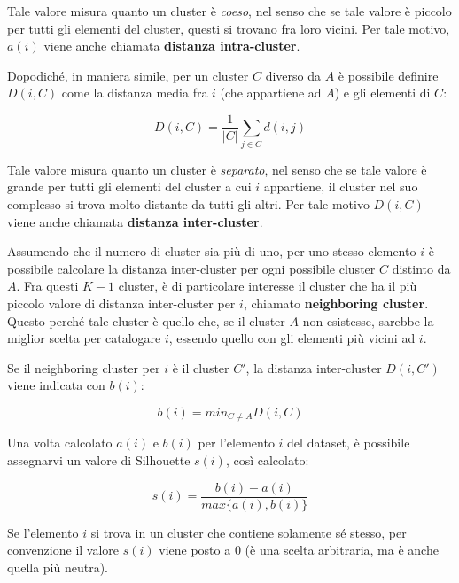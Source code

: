 \documentclass[a4paper, 12pt]{report}
\begin{document}
			Tale valore misura quanto un cluster è \textit{coeso}, nel senso
			che se tale valore è piccolo per tutti gli elementi del cluster,
			questi si trovano fra loro vicini. Per tale motivo, $a(i)$ viene
			anche chiamata \textbf{distanza intra-cluster}.

			Dopodiché, in maniera simile, per un cluster $C$ diverso da $A$
			è possibile definire $D(i, C)$ come la distanza media fra $i$
			(che appartiene ad $A$) e gli elementi di $C$:

			\begin{equation*}
				D(i, C) = \frac{1}{|C|} \sum_{j \in C} d(i, j)
			\end{equation*}

			Tale valore misura quanto un cluster è \textit{separato}, nel senso
			che se tale valore è grande per tutti gli elementi del cluster a cui
			$i$ appartiene, il cluster nel suo complesso si trova molto distante
			da tutti gli altri. Per tale motivo $D(i, C)$ viene anche chiamata
			\textbf{distanza inter-cluster}.

			Assumendo che il numero di cluster sia più di uno, per uno stesso elemento
			$i$ è possibile calcolare la distanza inter-cluster per ogni possibile
			cluster $C$ distinto da $A$. Fra questi $K - 1$ cluster, è di particolare
			interesse il cluster che ha il più piccolo valore di distanza inter-cluster
			per $i$, chiamato \textbf{neighboring cluster}. Questo perché tale cluster
			è quello che, se il cluster $A$ non esistesse, sarebbe la miglior scelta
			per catalogare $i$, essendo quello con gli elementi più vicini ad $i$.

			Se il neighboring cluster per $i$ è il cluster $C'$, la distanza
			inter-cluster $D(i, C')$ viene indicata con $b(i)$:

			\begin{equation}
				b(i) = min_{C \neq A} D(i, C)
			\end{equation}

			Una volta calcolato $a(i)$ e $b(i)$ per l'elemento $i$ del dataset, è
			possibile assegnarvi un valore di Silhouette $s(i)$, così calcolato:

			\begin{equation}
				s(i) = \frac{b(i) - a(i)}{max\{a(i), b(i)\}}
			\end{equation}

			Se l'elemento $i$ si trova in un cluster che contiene solamente sé stesso,
			per convenzione il valore $s(i)$ viene posto a $0$ (è una scelta arbitraria,
			ma è anche quella più neutra).
\end{document}
